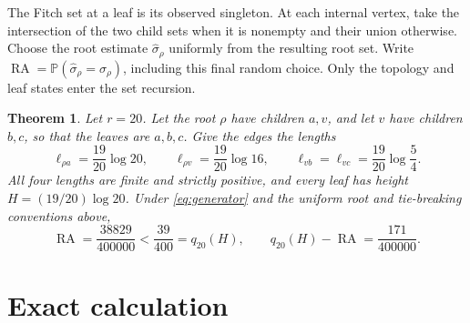 \documentclass[11pt]{article}
\newtheorem{theorem}{Theorem}
\newcommand{\RA}{\operatorname{RA}}
\newcommand{\Prob}{\mathbb P}
\begin{document}
The Fitch set at a leaf is its observed singleton. At each internal vertex,
take the intersection of the two child sets when it is nonempty and their union
otherwise. Choose the root estimate $\widehat\sigma_\rho$ uniformly from the
resulting root set. Write
$\RA=\Prob(\widehat\sigma_\rho=\sigma_\rho)$, including this final random choice.
Only the topology and leaf states enter the set recursion.

\begin{theorem}\label{thm:counterexample}
Let $r=20$. Let the root $\rho$ have children $a,v$, and let $v$ have children
$b,c$, so that the leaves are $a,b,c$. Give the edges the lengths
\begin{equation}\label{eq:lengths}
 \ell_{\rho a}=\frac{19}{20}\log20,\qquad
 \ell_{\rho v}=\frac{19}{20}\log16,\qquad
 \ell_{vb}=\ell_{vc}=\frac{19}{20}\log\frac54.
\end{equation}
All four lengths are finite and strictly positive, and every leaf has height
$H=(19/20)\log20$. Under \eqref{eq:generator} and the uniform root and tie-breaking
conventions above,
\begin{equation}\label{eq:result}
 \RA=\frac{38829}{400000}
   <\frac{39}{400}=q_{20}(H),\qquad
 q_{20}(H)-\RA=\frac{171}{400000}.
\end{equation}
\end{theorem}

\section{Exact calculation}
\end{document}
